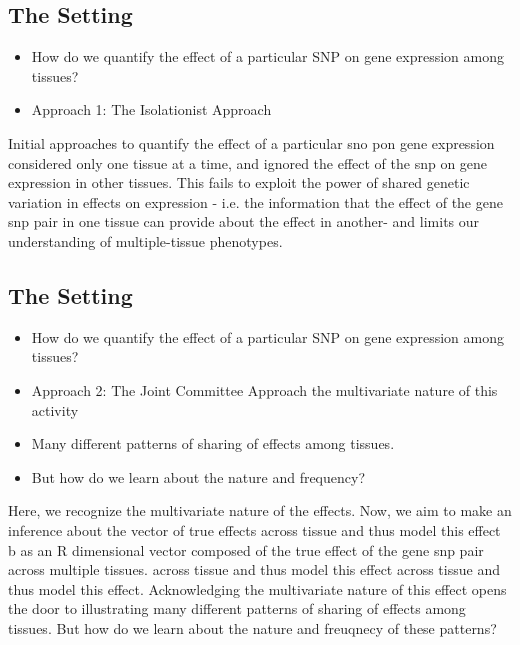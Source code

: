 \documentclass[10pt,letterpaper]{article}
\begin{document}
\subsection{The Setting}
\begin{itemize}
\item{How do we quantify the effect of a particular SNP on gene expression among tissues?}
\item{Approach 1: The Isolationist Approach}
\end{itemize}
%
Initial approaches to quantify the effect of a particular sno pon gene expression considered only one tissue at a time, and ignored the effect of the snp on gene expression in other tissues. This fails to  exploit the power of  shared genetic variation in effects on expression - i.e. the information that the effect of the gene snp pair in one tissue can provide about the effect in another- and limits our understanding of multiple-tissue phenotypes. 



\subsection{The Setting}
\begin{itemize}
\item{How do we quantify the effect of a particular SNP on gene expression among tissues?}
\item{Approach 2: The Joint Committee Approach}
\itemRecognize the multivariate nature of this activity
\item Many different patterns of sharing of effects among tissues.
\item But how do we learn about the nature and frequency?
\end{itemize}

Here, we recognize the multivariate nature of the effects. Now, we aim to make an inference about the vector of  true effects across tissue and thus model this effect b as an R dimensional vector composed of the true effect of the gene snp pair across multiple tissues. across tissue and thus model this effect across tissue and thus model this effect. Acknowledging the multivariate nature of this effect opens the door to illustrating many different patterns of sharing of effects among tissues. But how do we learn about the nature and freuqnecy of these patterns?
\end{document}
